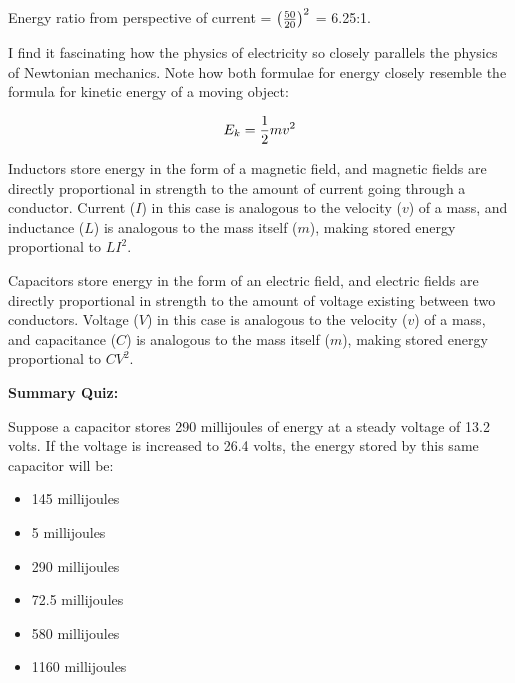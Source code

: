 \vskip 10pt

Energy ratio from perspective of current = $\left({50 \over 20}\right)^2$ = 6.25:1.

\vskip 10pt

I find it fascinating how the physics of electricity so closely parallels the physics of Newtonian mechanics.  Note how both formulae for energy closely resemble the formula for kinetic energy of a moving object:

$$E_k = {1 \over 2}mv^2$$

\vskip 10pt

Inductors store energy in the form of a magnetic field, and magnetic fields are directly proportional in strength to the amount of current going through a conductor.  Current ($I$) in this case is analogous to the velocity ($v$) of a mass, and inductance ($L$) is analogous to the mass itself ($m$), making stored energy proportional to $LI^2$.

\vskip 10pt

Capacitors store energy in the form of an electric field, and electric fields are directly proportional in strength to the amount of voltage existing between two conductors.  Voltage ($V$) in this case is analogous to the velocity ($v$) of a mass, and capacitance ($C$) is analogous to the mass itself ($m$), making stored energy proportional to $CV^2$.








\vfil \eject

\noindent
{\bf Summary Quiz:}

Suppose a capacitor stores 290 millijoules of energy at a steady voltage of 13.2 volts.  If the voltage is increased to 26.4 volts, the energy stored by this same capacitor will be:

\begin{itemize}
\item{} 145 millijoules
\vskip 5pt 
\item{} 5 millijoules
\vskip 5pt 
\item{} 290 millijoules
\vskip 5pt 
\item{} 72.5 millijoules
\vskip 5pt 
\item{} 580 millijoules
\vskip 5pt 
\item{} 1160 millijoules
\end{itemize}





